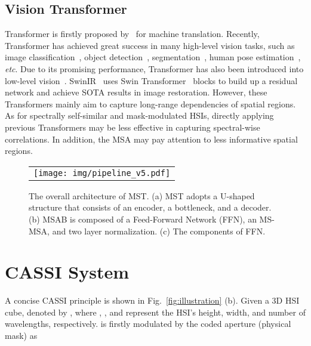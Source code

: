 \documentclass[10pt,twocolumn,letterpaper]{article}
\begin{document}
\subsection{Vision Transformer}
Transformer is firstly proposed by~\cite{vaswani2017attention} for machine translation. Recently, Transformer has achieved great success in many high-level vision tasks, such as image classification~\cite{liu2021swin,arnab2021vivit,global_msa,xcit}, object detection~\cite{de_detr,to_1,DETR,dy_detr}, segmentation~\cite{tc_3,cao2021swin,SETR}, human pose estimation~\cite{tokenpose,transpose,rsn,prtr},  \emph{etc}. Due to its promising performance, Transformer has also been introduced into low-level vision~\cite{ipt,swinir,vsrt,uformer,pngan,fgst,rformer}.  SwinIR~\cite{swinir} uses Swin Transformer~\cite{swinir} blocks to build up a residual network and achieve SOTA results in image restoration. However, these Transformers mainly aim to capture long-range dependencies of spatial regions. As for spectrally self-similar and mask-modulated HSIs, directly applying previous Transformers may be less effective in capturing spectral-wise correlations. In addition, the MSA may pay attention to  less informative spatial regions.


\begin{figure*}[t]
	\begin{center}
		\begin{tabular}[t]{c} \hspace{-3.4mm}
			\texttt{[image: img/pipeline\_v5.pdf]}
		\end{tabular}
	\end{center}
	\vspace*{-6mm}
	\caption{\small The overall architecture of MST. (a) MST adopts a U-shaped structure that consists of an encoder, a bottleneck, and a decoder. (b) MSAB is composed of a Feed-Forward Network (FFN), an MS-MSA, and two layer normalization. (c) The components of FFN.}
	\label{fig:pipeline}
	\vspace{-4mm}
\end{figure*}

\vspace{-0.3mm}
\section{CASSI System}
\vspace{-0.3mm}
A concise CASSI principle is shown in Fig.~\ref{fig:illustration} (b). Given a 3D HSI cube, denoted by , where , , and  represent the HSI's height, width, and number of wavelengths, respectively.  is firstly modulated by the coded aperture (physical mask)  as 
\vspace{-1.2mm}
 
\end{document}
